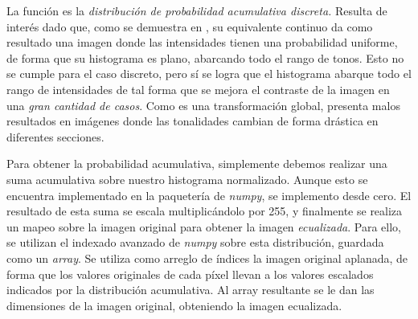 \documentclass[12pt]{article}
\begin{document}
La función es la \textit{distribución de probabilidad acumulativa discreta.} Resulta de interés dado que, como se demuestra en \cite{gonzalezDigitalImageProcessing2017}
, su equivalente continuo da como resultado una imagen donde las intensidades tienen una probabilidad uniforme, de forma que su histograma es plano, abarcando todo el rango de tonos. Esto no se cumple para el caso discreto, pero sí se logra que el histograma abarque todo el rango de intensidades de tal forma que se mejora el contraste de la imagen en una \textit{gran cantidad de casos}. Como es una transformación global, presenta malos resultados en imágenes donde las tonalidades cambian de forma drástica en diferentes secciones.

Para obtener la probabilidad acumulativa, simplemente debemos realizar una suma acumulativa sobre nuestro histograma normalizado. Aunque esto se encuentra implementado en la paquetería de \textit{numpy}, se implemento desde cero. El resultado de esta suma se escala multiplicándolo por 255, y finalmente se realiza un mapeo sobre la imagen original para obtener la imagen \textit{ecualizada}. Para ello, se utilizan el indexado avanzado de \textit{numpy} sobre esta distribución, guardada como un \textit{array}. Se utiliza como arreglo de índices la imagen original aplanada, de forma que los valores originales de cada píxel llevan a los valores escalados indicados por la distribución acumulativa. Al array resultante se le dan las dimensiones de la imagen original, obteniendo la imagen ecualizada. 
\end{document}
